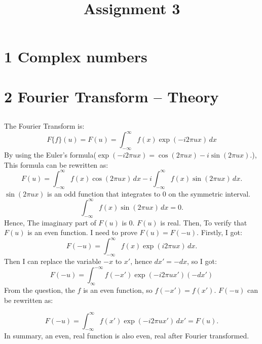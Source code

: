 \documentclass[12pt]{article}
\title{Assignment 3}
\begin{document}
\maketitle
\section{1 Complex numbers}

\section{2 Fourier Transform – Theory}
\subsection{}
The Fourier Transform is:
\[F\{f\}(u) = F(u) = \int_{-\infty}^{\infty} f(x) \exp(-i 2\pi ux) \,dx\]
By using the Euler's formula(\(\exp(-i 2\pi ux) = \cos(2\pi ux) - i\sin(2\pi ux).\)), This formula can be rewritten as:
\[
F(u) = \int_{-\infty}^{\infty} f(x) \cos(2\pi ux) \,dx - i \int_{-\infty}^{\infty} f(x) \sin(2\pi ux) \,dx.
\]
\(\sin(2\pi ux)\) is an odd function that integrates to 0 on the symmetric interval.
\[
\int_{-\infty}^{\infty} f(x) \sin(2\pi ux) \,dx = 0.
\]
Hence, The imaginary part of \(F(u)\) is 0. \(F(u)\) is real.
\newline
Then, To verify that \(F(u)\) is an even function. I need to prove \(F(u) = F(-u)\).
Firstly, I got:
\[
F(-u) = \int_{-\infty}^{\infty} f(x) \exp(i 2\pi ux) \,dx.
\]
Then I can replace the variable \(-x\) to \(x'\), hence \(dx' = -dx\), so I got:
\[
F(-u) = \int_{\infty}^{-\infty} f(-x') \exp(-i 2\pi ux') (-dx') 
\]
From the question, the \(f\) is an even function, so \(f(-x')=f(x')\).
\(F(-u)\) can be rewritten as:

\[F(-u) = \int_{-\infty}^{\infty} f(x') \exp(-i 2\pi ux') \,dx' = F(u).\]
In summary, an even, real function is also even, real after Fourier transformed.
\end{document}

